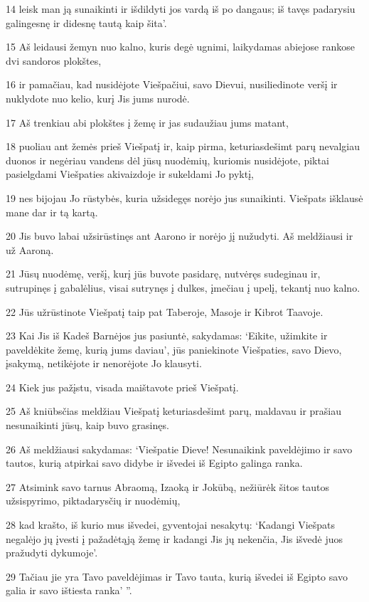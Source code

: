 \par 14 leisk man ją sunaikinti ir išdildyti jos vardą iš po dangaus; iš tavęs padarysiu galingesnę ir didesnę tautą kaip šita’. 
\par 15 Aš leidausi žemyn nuo kalno, kuris degė ugnimi, laikydamas abiejose rankose dvi sandoros plokštes, 
\par 16 ir pamačiau, kad nusidėjote Viešpačiui, savo Dievui, nusiliedinote veršį ir nuklydote nuo kelio, kurį Jis jums nurodė. 
\par 17 Aš trenkiau abi plokštes į žemę ir jas sudaužiau jums matant, 
\par 18 puoliau ant žemės prieš Viešpatį ir, kaip pirma, keturiasdešimt parų nevalgiau duonos ir negėriau vandens dėl jūsų nuodėmių, kuriomis nusidėjote, piktai pasielgdami Viešpaties akivaizdoje ir sukeldami Jo pyktį, 
\par 19 nes bijojau Jo rūstybės, kuria užsidegęs norėjo jus sunaikinti. Viešpats išklausė mane dar ir tą kartą. 
\par 20 Jis buvo labai užsirūstinęs ant Aarono ir norėjo jį nužudyti. Aš meldžiausi ir už Aaroną. 
\par 21 Jūsų nuodėmę, veršį, kurį jūs buvote pasidarę, nutvėręs sudeginau ir, sutrupinęs į gabalėlius, visai sutrynęs į dulkes, įmečiau į upelį, tekantį nuo kalno. 
\par 22 Jūs užrūstinote Viešpatį taip pat Taberoje, Masoje ir Kibrot Taavoje. 
\par 23 Kai Jis iš Kadeš Barnėjos jus pasiuntė, sakydamas: ‘Eikite, užimkite ir paveldėkite žemę, kurią jums daviau’, jūs paniekinote Viešpaties, savo Dievo, įsakymą, netikėjote ir nenorėjote Jo klausyti. 
\par 24 Kiek jus pažįstu, visada maištavote prieš Viešpatį. 
\par 25 Aš kniūbsčias meldžiau Viešpatį keturiasdešimt parų, maldavau ir prašiau nesunaikinti jūsų, kaip buvo grasinęs. 
\par 26 Aš meldžiausi sakydamas: ‘Viešpatie Dieve! Nesunaikink paveldėjimo ir savo tautos, kurią atpirkai savo didybe ir išvedei iš Egipto galinga ranka. 
\par 27 Atsimink savo tarnus Abraomą, Izaoką ir Jokūbą, nežiūrėk šitos tautos užsispyrimo, piktadarysčių ir nuodėmių, 
\par 28 kad krašto, iš kurio mus išvedei, gyventojai nesakytų: ‘Kadangi Viešpats negalėjo jų įvesti į pažadėtąją žemę ir kadangi Jis jų nekenčia, Jis išvedė juos pražudyti dykumoje’. 
\par 29 Tačiau jie yra Tavo paveldėjimas ir Tavo tauta, kurią išvedei iš Egipto savo galia ir savo ištiesta ranka’ ”.



